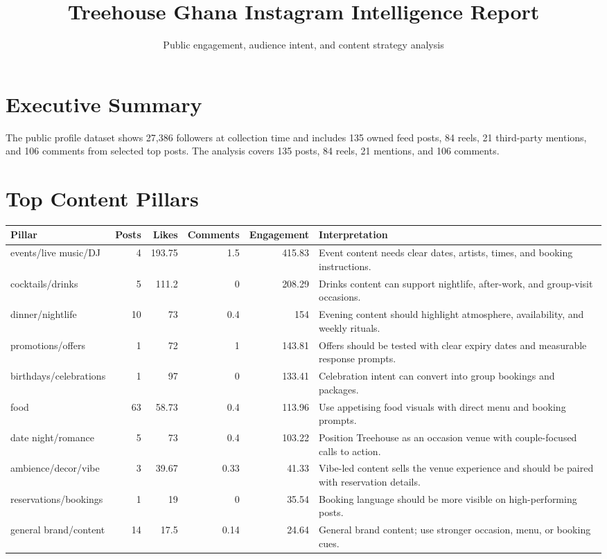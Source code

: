 \documentclass[11pt]{article}
\title{Treehouse Ghana Instagram Intelligence Report}
\author{Public engagement, audience intent, and content strategy analysis}
\date{}
\begin{document}
\maketitle
\section*{Executive Summary}
The public profile dataset shows 27,386 followers at collection time and includes 135 owned feed posts, 84 reels, 21 third-party mentions, and 106 comments from selected top posts.
The analysis covers 135 posts, 84 reels, 21 mentions, and 106 comments.
\section*{Top Content Pillars}
\begin{longtable}{p{}rrrrp{}}
Pillar & Posts & Likes & Comments & Engagement & Interpretation \\ \hline
events/live music/DJ & 4 & 193.75 & 1.5 & 415.83 & Event content needs clear dates, artists, times, and booking instructions. \\
cocktails/drinks & 5 & 111.2 & 0 & 208.29 & Drinks content can support nightlife, after-work, and group-visit occasions. \\
dinner/nightlife & 10 & 73 & 0.4 & 154 & Evening content should highlight atmosphere, availability, and weekly rituals. \\
promotions/offers & 1 & 72 & 1 & 143.81 & Offers should be tested with clear expiry dates and measurable response prompts. \\
birthdays/celebrations & 1 & 97 & 0 & 133.41 & Celebration intent can convert into group bookings and packages. \\
food & 63 & 58.73 & 0.4 & 113.96 & Use appetising food visuals with direct menu and booking prompts. \\
date night/romance & 5 & 73 & 0.4 & 103.22 & Position Treehouse as an occasion venue with couple-focused calls to action. \\
ambience/decor/vibe & 3 & 39.67 & 0.33 & 41.33 & Vibe-led content sells the venue experience and should be paired with reservation details. \\
reservations/bookings & 1 & 19 & 0 & 35.54 & Booking language should be more visible on high-performing posts. \\
general brand/content & 14 & 17.5 & 0.14 & 24.64 & General brand content; use stronger occasion, menu, or booking cues. \\
\end{longtable}
\end{document}

